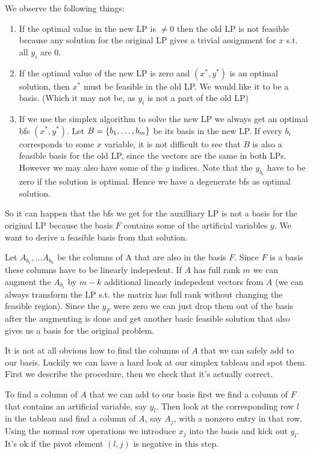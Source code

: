 We observe the following things:

\begin{enumerate}
\item If the optimal value in the new LP is $\neq 0$ then the old LP is not feasible because any solution for the original LP gives a trivial assignment for $x$ s.t. all $y_i$ are 0.
\item If the optimal value of the new LP is zero and $(x^*, y^*)$ is an optimal solution, then $x^*$ must be feasible in the old LP. We would like it to be a basis. (Which it may not be, as $y_i$ is not a part of the old LP)
\item If we use the simplex algorithm to solve the new LP we always get an optimal bfs $(x^*,y^*)$. Let $B=\{{b}_1,\ldots,{b}_{m}\}$ be its basis in the new LP. If every $b_i$ corresponds to some $x$ variable, it is not difficult to see that $B$ is also a feasible basis for the old LP, since the vectors are the same in both LPs. However we may also have some of the $y$ indices. Note that the $y_{b_i}$ have to be zero if the solution is optimal. Hence we have a degenerate bfs as optimal solution.
\end{enumerate}

So it can happen that the bfs we get for the auxilliary LP is not a basis for the original LP because the basis $F$ contains some of the artificial variables $y$. We want to derive a feasible basis from that solution.

Let $A_{b_1},\ldots A_{b_k}$ be the columns of A that are also in the basis $F$. Since $F$ is a basis these columns have to be linearly indepedent. If $A$ has full rank $m$ we can augment the $A_{b_i}$ by $m-k$ additional linearly indepedent vectors from $A$ (we can always transform the LP s.t. the matrix has full rank without changing the feasible region). Since the $y_F$ were zero we can just drop them out of the basis after the augmenting is done and get another basic feasible solution that also gives us a basis for the original problem.

It is not at all obvious how to find the columns of $A$ that we can safely add to our basis. Luckily we can have a hard look at our simplex tableau and spot them. First we describe the procedure, then we check that it's actually correct.

To find a column of $A$ that we can add to our basis first we find a column of $F$ that contains an artificial variable, say $y_l$. Then look at the corresponding row $l$ in the tableau and find a column of $A$, say $A_j$, with a nonzero entry in that row. Using the normal row operations we introduce $x_j$ into the basis and kick out $y_l$. It's ok if the pivot element $(l,j)$ is negative in this step.

